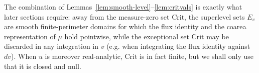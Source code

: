 \begin{remark}\label{rem:ae-suffices}
The combination of Lemmas~\ref{lem:smooth-level}--\ref{lem:critvals} is exactly
what later sections require: away from the measure-zero set $\mathrm{Crit}$,
the superlevel sets $E_v$ are smooth finite-perimeter domains for which the
flux identity and the coarea representation of $\mu$ hold pointwise, while the
exceptional set $\mathrm{Crit}$ may be discarded in any integration in $v$
(e.g. when integrating the flux identity against $dv$). When $u$ is moreover
real-analytic, $\mathrm{Crit}$ is in fact finite, but we shall only use that it
is closed and null.
\end{remark}
